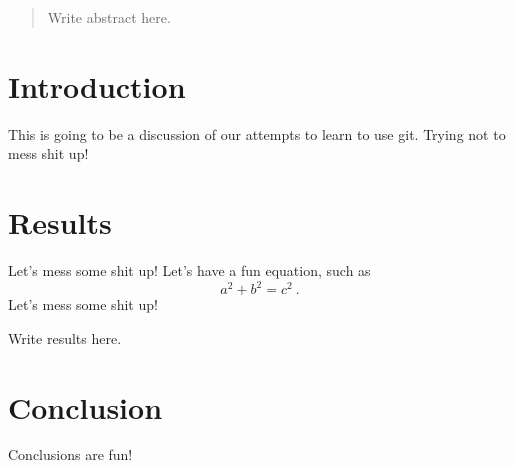 \documentclass{article}
\begin{document}
\begin{abstract}
Write abstract here.
\end{abstract}

\section{Introduction}

This is going to be a discussion of our attempts to learn to use git.
Trying not to mess shit up!

\section{Results}

Let's mess some shit up!
Let's have a fun equation, such as
\begin{equation}
a^2 + b^2 = c^2~.
\end{equation}
Let's mess some shit up!

Write results here.

\section{Conclusion}

Conclusions are fun!
\end{document}
